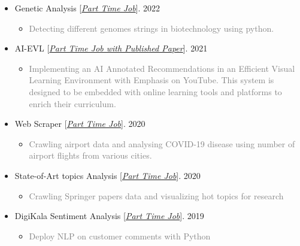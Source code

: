 \documentclass[10pt,a4paper,sans]{moderncv} %
\begin{document}
\begin{itemize}
		\item Genetic Analysis [\href{mailto:mbahmanabadi96@gmail.com}{\emph{Part Time Job}}]. \hfill 2022
		\begin{itemize}
			\item \textcolor{gray} {Detecting different genomes strings in biotechnology using python.}
		\end{itemize}

		\item AI-EVL [\href{https://arxiv.org/pdf/2203.11157.pdf}{\emph{Part Time Job with Published Paper}}]. \hfill 2021
		\begin{itemize}
			\item \textcolor{gray} {Implementing an AI Annotated Recommendations in an Efficient Visual Learning Environment with Emphasis on YouTube. This system is designed to be embedded with online learning tools and platforms to enrich their curriculum.}
		\end{itemize}
		
		\item Web Scraper [\href{mailto:mbahmanabadi96@gmail.com}{\emph{Part Time Job}}]. \hfill 2020
		\begin{itemize}
			\item \textcolor{gray} {Crawling airport data and analysing COVID-19 disease using number of airport flights from various cities.}
		\end{itemize}

		\item State-of-Art topics Analysis [\href{mailto:mbahmanabadi96@gmail.com}{\emph{Part Time Job}}]. \hfill 2020
		\begin{itemize}
			\item \textcolor{gray} {Crawling Springer papers data and visualizing hot topics for research}
		\end{itemize}
		
		\item DigiKala Sentiment Analysis [\href{mailto:mbahmanabadi96@gmail.com}{\emph{Part Time Job}}]. \hfill 2019
		\begin{itemize}
			\item \textcolor{gray} {Deploy NLP on customer comments with Python}
		\end{itemize}		

	\end{itemize}


	
\end{document}
